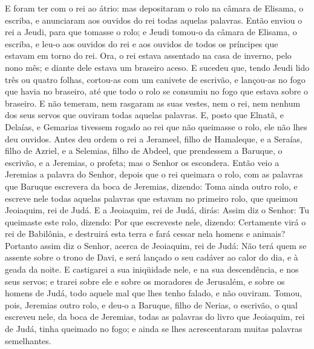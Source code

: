 E foram ter com o rei ao átrio: mas depositaram o rolo na câmara
de Elisama, o escriba, e anunciaram aos ouvidos do rei todas aquelas
palavras. Então enviou o rei a Jeudi, para que tomasse o
rolo; e Jeudi tomou-o da câmara de Elisama, o escriba, e leu-o aos
ouvidos do rei e aos ouvidos de todos os príncipes que estavam em
torno do rei. Ora, o rei estava assentado na casa de inverno,
pelo nono mês; e diante dele estava um braseiro aceso. E
sucedeu que, tendo Jeudi lido três ou quatro folhas, cortou-as com
um canivete de escrivão, e lançou-as no fogo que havia no braseiro,
até que todo o rolo se consumiu no fogo que estava sobre o braseiro.
E não temeram, nem rasgaram as suas vestes, nem o rei, nem
nenhum dos seus servos que ouviram todas aquelas palavras. E,
posto que Elnatã, e Delaías, e Gemarias tivessem rogado ao rei que
não queimasse o rolo, ele não lhes deu ouvidos. Antes deu
ordem o rei a Jerameel, filho de Hamaleque, e a Seraías, filho de
Azriel, e a Selemias, filho de Abdeel, que prendessem a Baruque, o
escrivão, e a Jeremias, o profeta; mas o Senhor os escondera.
Então veio a Jeremias a palavra do Senhor, depois que o rei
queimara o rolo, com as palavras que Baruque escrevera da boca de
Jeremias, dizendo: Toma ainda outro rolo, e escreve nele
todas aquelas palavras que estavam no primeiro rolo, que queimou
Jeoiaquim, rei de Judá. E a Jeoiaquim, rei de Judá, dirás:
Assim diz o Senhor: Tu queimaste este rolo, dizendo: Por que
escreveste nele, dizendo: Certamente virá o rei de Babilônia, e
destruirá esta terra e fará cessar nela homens e animais?
Portanto assim diz o Senhor, acerca de Jeoiaquim, rei de
Judá: Não terá quem se assente sobre o trono de Davi, e será lançado
o seu cadáver ao calor do dia, e à geada da noite. E
castigarei a sua iniqüidade nele, e na sua descendência, e nos seus
servos; e trarei sobre ele e sobre os moradores de Jerusalém, e
sobre os homens de Judá, todo aquele mal que lhes tenho falado, e
não ouviram. Tomou, pois, Jeremias outro rolo, e deu-o a
Baruque, filho de Nerias, o escrivão, o qual escreveu nele, da boca
de Jeremias, todas as palavras do livro que Jeoiaquim, rei de Judá,
tinha queimado no fogo; e ainda se lhes acrescentaram muitas
palavras semelhantes.

\medskip

